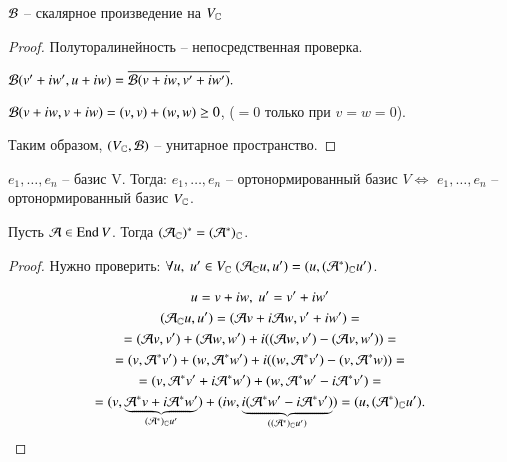 \documentclass[main]{subfiles}
\begin{document}
    \begin{proposition}
        $\mathcal{B}$ -- скалярное произведение на $V_{\mathbb{C}}$
    \end{proposition}
    \begin{proof}
        Полуторалинейность -- непосредственная проверка. 

        $\mathcal{B}(v'+iw', u+iw) = \overline{\mathcal{B}(v + i w, v' + iw')}.$ 

        $\mathcal{B}(v + iw, v + iw) = (v, v) + (w, w) \geq 0$, ($=0$ только при $v = w = 0$).

        Таким образом, $(V_{\mathbb{C}}, \mathcal{B})$ -- унитарное пространство.
    \end{proof}

    \begin{remark}
         $e_1, \ldots, e_n$ -- базис V. Тогда: $e_1, \ldots, e_n$ -- ортонормированный базис $V \Leftrightarrow$  $e_1, \ldots, e_n$ -- ортонормированный базис $V_{\mathbb{C}}$.
    \end{remark}

    \begin{proposition}
        Пусть $\mathcal{A} \in \operatorname{End} V$. Тогда $(\mathcal{A}_{\mathbb{C}})^* = (\mathcal{A}^*)_{\mathbb{C}}$.
    \end{proposition}

    \begin{proof}
        Нужно проверить: $\forall u, \ u' \in V_{\mathbb{C}} \ (\mathcal{A}_{\mathbb{C}}u, u') = (u, (\mathcal{A}^*)_{\mathbb{C}} u')$. 

        \begin{gather*}
            u = v + iw, \ u' = v' + iw' \\
            (\mathcal{A}_{\mathbb{C}}u, u') = (\mathcal{A} v + i \mathcal{A} w, v' + iw') = \\
            = (\mathcal{A} v, v') + (\mathcal{A} w, w') + i((\mathcal{A} w, v') - (\mathcal{A} v, w')) = \\
            = (v, \mathcal{A}^* v') + (w, \mathcal{A}^* w') + i((w, \mathcal{A}^* v') - (v, \mathcal{A}^*w)) = \\
            = (v, \mathcal{A}^*v' + i\mathcal{A}^*w') + (w, \mathcal{A}^*w' - i\mathcal{A}^* v') = \\
            = (v, \underbrace{\mathcal{A}^*v+ i\mathcal{A}^* w'}_{(\mathcal{A}^*)_{\mathbb{C}}u'}) + (iw, \underbrace{i(\mathcal{A}^*w'-i\mathcal{A}^*v')}_{((\mathcal{A}^*)_{\mathbb{C}}u')}) = (u, (\mathcal{A}^*)_{\mathbb{C}} u').
        \end{gather*}
    \end{proof}
\end{document}
